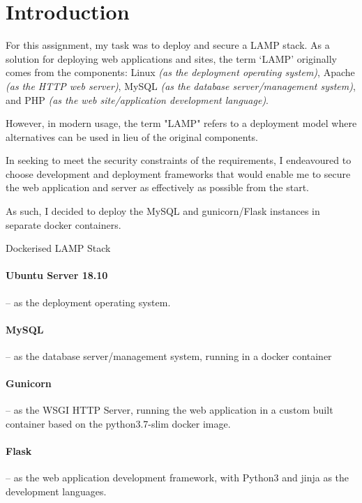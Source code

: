 \section{Introduction}

For this assignment, my task was to deploy and secure a LAMP stack. As a solution for deploying web applications and sites, the term `LAMP' originally comes from the components: Linux \textit{(as the deployment operating system)}, Apache \textit{(as the HTTP web server)}, MySQL \textit{(as the database server/management system)}, and PHP \textit{(as the web site/application development language)}.

However, in modern usage, the term "LAMP" refers to a deployment model where alternatives can be used in lieu of the original components.

In seeking to meet the security constraints of the requirements, I endeavoured to choose development and deployment frameworks that would enable me to secure the web application and server as effectively as possible from the start.

As such, I decided to deploy the MySQL and gunicorn/Flask instances in separate docker containers.


\begin{displaytable}{\label{display:lamp_stack}}{Dockerised LAMP Stack}
  \paragraph{\href{http://releases.ubuntu.com/18.10/ubuntu-18.10-live-server-amd64.iso}{\faUbuntu} Ubuntu Server 18.10}
  \hspace{-0.6em}-- as the deployment operating system.
  \paragraph{\href{https://hub.docker.com/\_/mysql}{\faDatabase} MySQL}
  \hspace{-0.6em}-- as the database server/management system, running in a docker container 
  \paragraph{\href{https://pypi.org/project/gunicorn/}{\faServer} Gunicorn}
  \hspace{-0.6em}-- as the WSGI HTTP Server, running the web application in a custom built container based on the python3.7-slim docker image.
  \paragraph{\href{https://pypi.org/project/Flask/1.0.2/}{\faPython} Flask}
  \hspace{-0.6em}-- as the web application development framework, with Python3 and jinja as the development languages.
  \vspace{1em}
\end{displaytable}
